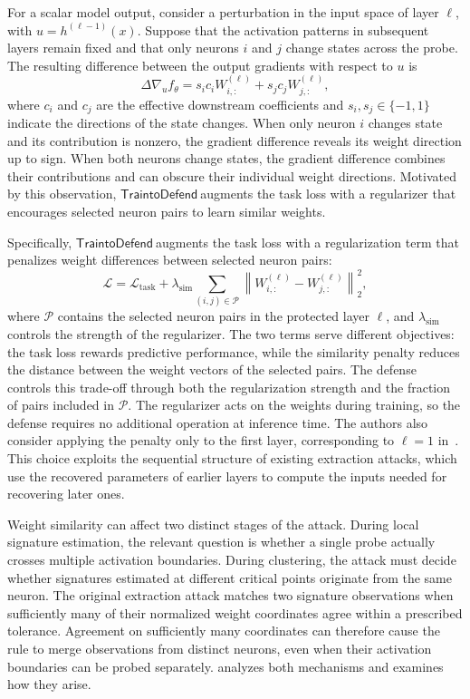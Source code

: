 \documentclass[runningheads]{llncs}
\newcommand{\td}{$\mathsf{Train to Defend}~$}
\begin{document}
For a scalar model output, consider a perturbation in the input space of layer $\ell$, with $u=h^{(\ell-1)}(x)$.
Suppose that the activation patterns in subsequent layers remain fixed and that only neurons $i$ and $j$ change states across the probe.
The resulting difference between the output gradients with respect to $u$ is
\begin{equation*}
\Delta\nabla_u f_\theta = s_i c_i W_{i,:}^{(\ell)} + s_j c_j W_{j,:}^{(\ell)},
\end{equation*}
where $c_i$ and $c_j$ are the effective downstream coefficients and $s_i,s_j\in\{-1,1\}$ indicate the directions of the state changes.
When only neuron $i$ changes state and its contribution is nonzero, the gradient difference reveals its weight direction up to sign.
When both neurons change states, the gradient difference combines their contributions and can obscure their individual weight directions.
Motivated by this observation, \td augments the task loss with a regularizer that encourages selected neuron pairs to learn similar weights.

Specifically, \td augments the task loss with a regularization term that penalizes weight differences between selected neuron pairs:
\begin{equation}\label{eq-t2d}
\mathcal L=\mathcal L_{\mathrm{task}}+\lambda_{\mathrm{sim}}\sum_{(i,j)\in\mathcal P}\left\|W_{i,:}^{(\ell)}-W_{j,:}^{(\ell)}\right\|_2^2,
\end{equation}
where $\mathcal P$ contains the selected neuron pairs in the protected layer $\ell$, and $\lambda_{\mathrm{sim}}$ controls the strength of the regularizer.
The two terms serve different objectives: the task loss rewards predictive performance, while the similarity penalty reduces the distance between the weight vectors of the selected pairs.
The defense controls this trade-off through both the regularization strength and the fraction of pairs included in $\mathcal P$.
The regularizer acts on the weights during training, so the defense requires no additional operation at inference time.
The authors also consider applying the penalty only to the first layer, corresponding to $\ell=1$ in~.
This choice exploits the sequential structure of existing extraction attacks, which use the recovered parameters of earlier layers to compute the inputs needed for recovering later ones.

Weight similarity can affect two distinct stages of the attack.
During local signature estimation, the relevant question is whether a single probe actually crosses multiple activation boundaries.
During clustering, the attack must decide whether signatures estimated at different critical points originate from the same neuron.
The original extraction attack matches two signature observations when sufficiently many of their normalized weight coordinates agree within a prescribed tolerance.
Agreement on sufficiently many coordinates can therefore cause the rule to merge observations from distinct neurons, even when their activation boundaries can be probed separately.
 analyzes both mechanisms and examines how they arise.
\end{document}
